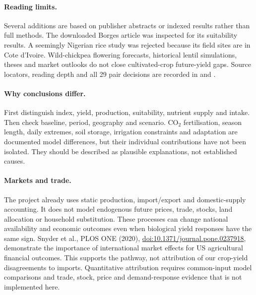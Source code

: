\paragraph{Reading limits.} Several additions are based on publisher abstracts or indexed results rather than full
methods. The downloaded Borges article was inspected for its suitability results. A seemingly Nigerian rice study
was rejected because its field sites are in Cote d'Ivoire. Wild-chickpea flowering forecasts, historical lentil
simulations, theses and market outlooks do not close cultivated-crop future-yield gaps. Source locators, reading
depth and all 29 pair decisions are recorded in  and
.

\paragraph{Why conclusions differ.} First distinguish index, yield, production, suitability, nutrient supply and
intake. Then check baseline, period, geography and scenario. CO$_2$ fertilisation, season length, daily extremes,
soil storage, irrigation constraints and adaptation are documented model differences, but their individual
contributions have not been isolated. They should be described as plausible explanations, not established causes.

\paragraph{Markets and trade.} The project already uses static production, import/export and domestic-supply
accounting. It does not model endogenous future prices, trade, stocks, land allocation or household substitution.
These processes can change national availability and economic outcomes even when biological yield responses have
the same sign. Snyder et al., PLOS ONE (2020),
\href{https://doi.org/10.1371/journal.pone.0237918}{doi:10.1371/journal.pone.0237918}, demonstrate the importance of
international market effects for US agricultural financial outcomes. This supports the pathway, not attribution of
our crop-yield disagreements to imports. Quantitative attribution requires common-input model comparisons and
trade, stock, price and demand-response evidence that is not implemented here.
